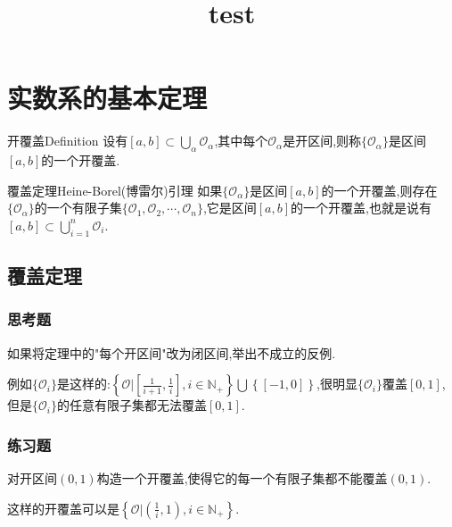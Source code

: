 \documentclass[cn,chinese,founder]{elegantbook}
\title{test}
\begin{document}
    \chapter{实数系的基本定理}
    \begin{definition}{开覆盖}{Definition}
        设有$[a,b]\subset\textstyle\bigcup_\alpha\mathcal{O} _\alpha$,其中每个$\mathcal{O}_\alpha$是开区间,则称$\{\mathcal{O}_\alpha\}$是区间$[a,b]$的一个开覆盖.
    \end{definition}
    \begin{theorem}{覆盖定理}{Heine-Borel(博雷尔)引理}
        如果$\{\mathcal{O}_\alpha\}$是区间$[a,b]$的一个开覆盖,则存在$\{\mathcal{O}_\alpha\}$的一个有限子集$\{\mathcal{O}_1,\mathcal{O}_2,\cdots,\mathcal{O}_n\}$,它是区间$[a,b]$的一个开覆盖,也就是说有$[a,b]\subset\textstyle\bigcup_{i=1}^n\mathcal{O}_i$.
    \end{theorem}
        \section{覆盖定理}
            \subsection{思考题}
            \begin{example}
                如果将定理中的"每个开区间"改为闭区间,举出不成立的反例.
            \end{example}
            \begin{solution}
                例如$\{\mathcal{O}_i\}$是这样的:$\left\{\mathcal{O}\bigg|\left[\frac{1}{i+1},\frac{1}{i}\right],i\in \mathbb{N}_+\right\}\textstyle\bigcup\left\{[-1,0]\right\}$,很明显$\{\mathcal{O}_i\}$覆盖$\left[0,1\right]$,但是$\{\mathcal{O}_i\}$的任意有限子集都无法覆盖$\left[0,1\right]$.
            \end{solution}

            \subsection{练习题}
            \begin{exercise}
                对开区间$(0,1)$构造一个开覆盖,使得它的每一个有限子集都不能覆盖$(0,1)$.
            \end{exercise}
            \begin{solution}
                这样的开覆盖可以是$\left\{\mathcal{O}\bigg|\left(\frac{1}{i},1\right),i\in\mathbb{N}_+\right\}$.
            \end{solution}
\end{document}
